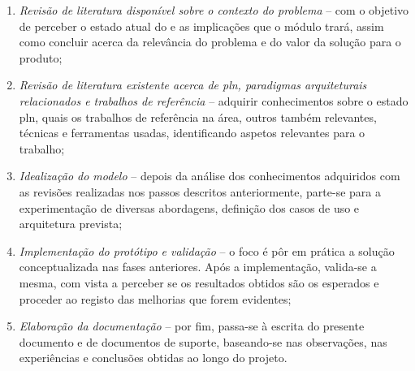\begin{enumerate}
    \item 
    {
        \textit{Revisão de literatura disponível sobre o contexto do problema} -- com o objetivo de perceber o estado atual do {\productname} e as implicações que o módulo trará, assim como concluir acerca da relevância do problema e do valor da solução para o produto;
    }
    \item
    {
        \textit{Revisão de literatura existente acerca de \gls{pln}, paradigmas arquiteturais relacionados e trabalhos de referência} -- adquirir conhecimentos sobre o estado \gls{pln}, quais os trabalhos de referência na área, outros também relevantes, técnicas e ferramentas usadas, identificando aspetos relevantes para o trabalho;
    }
    \item
    {
        \textit{Idealização do modelo} -- depois da análise dos conhecimentos adquiridos com as revisões realizadas nos passos descritos anteriormente,
        parte-se para a experimentação de diversas abordagens, definição dos casos de uso e arquitetura prevista;
    }
    \item
    {
        \textit{Implementação do protótipo e validação} -- o foco é pôr em prática a solução conceptualizada nas fases anteriores. Após a implementação, valida-se a mesma, com vista a perceber se os resultados obtidos são os esperados e proceder ao registo das melhorias que forem evidentes;
    }
    \item
    {
        \textit{Elaboração da documentação} --  por fim, passa-se à escrita do presente documento e de documentos de suporte, baseando-se nas observações, nas experiências e conclusões obtidas ao longo do projeto.
    }
\end{enumerate}